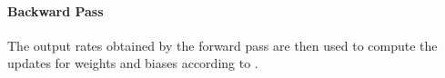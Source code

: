 
\paragraph{Backward Pass}
The output rates obtained by the forward pass are then used to compute the updates for weights and biases according to .

